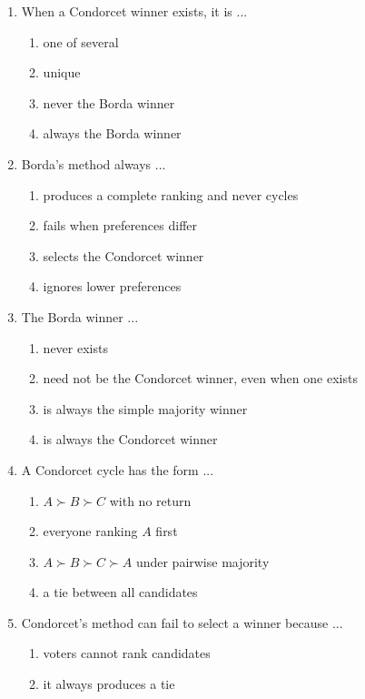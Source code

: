 \documentclass[11pt]{article}
\begin{document}
\begin{enumerate}[itemsep=6pt]
\begin{enumerate}
    \item ignores how voters rank \(x\) and \(y\)
    \item depends only on how voters rank \(x\) against \(y\), not on any third alternative
  \end{enumerate}
  \item When a Condorcet winner exists, it is ...
  \begin{enumerate}
    \item one of several
    \item unique
    \item never the Borda winner
    \item always the Borda winner
  \end{enumerate}
  \item Borda's method always ...
  \begin{enumerate}
    \item produces a complete ranking and never cycles
    \item fails when preferences differ
    \item selects the Condorcet winner
    \item ignores lower preferences
  \end{enumerate}
  \item The Borda winner ...
  \begin{enumerate}
    \item never exists
    \item need not be the Condorcet winner, even when one exists
    \item is always the simple majority winner
    \item is always the Condorcet winner
  \end{enumerate}
  \item A Condorcet cycle has the form ...
  \begin{enumerate}
    \item \(A \succ B \succ C\) with no return
    \item everyone ranking \(A\) first
    \item \(A \succ B \succ C \succ A\) under pairwise majority
    \item a tie between all candidates
  \end{enumerate}
  \item Condorcet's method can fail to select a winner because ...
  \begin{enumerate}
    \item voters cannot rank candidates
    \item it always produces a tie

\end{enumerate}
\end{enumerate}
\end{document}
